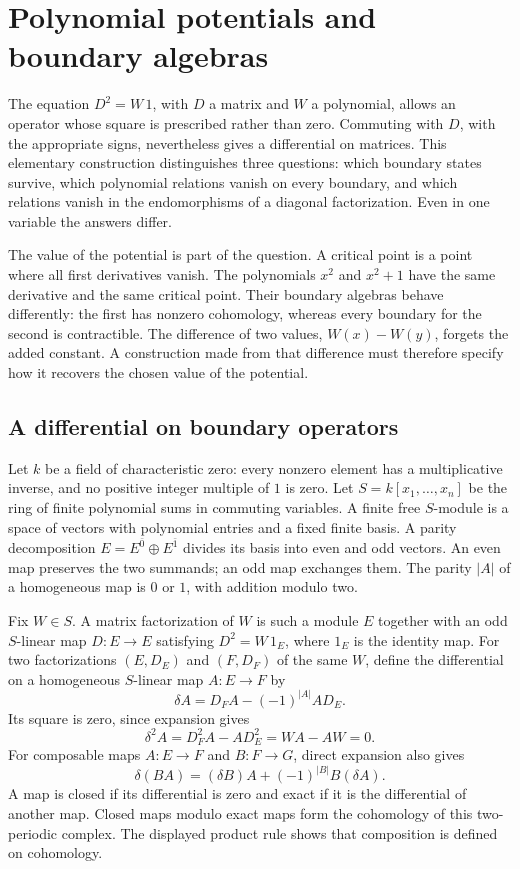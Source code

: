 \chapter{Polynomial potentials and boundary algebras}
\label{ch:polynomial-boundary-algebras}

The equation \(D^2=W\,1\), with \(D\) a matrix and \(W\) a polynomial,
allows an operator whose square is prescribed rather than zero.
Commuting with \(D\), with the appropriate signs, nevertheless gives
a differential on matrices. This elementary construction distinguishes
three questions: which boundary states survive, which polynomial
relations vanish on every boundary, and which relations vanish in the
endomorphisms of a diagonal factorization. Even in one variable the
answers differ.

The value of the potential is part of the question. A critical point
is a point where all first derivatives vanish. The polynomials
\(x^2\) and \(x^2+1\) have the same derivative and the same critical
point. Their boundary algebras behave differently: the first has
nonzero cohomology, whereas every boundary for the second is
contractible. The difference of two values,
\(W(x)-W(y)\), forgets the added constant. A construction made from
that difference must therefore specify how it recovers the chosen
value of the potential.

\section{A differential on boundary operators}
\label{sec:pb-boundary-differential}

Let \(k\) be a field of characteristic zero: every nonzero element has
a multiplicative inverse, and no positive integer multiple of \(1\)
is zero. Let \(S=k[x_1,\ldots,x_n]\) be the ring of finite polynomial
sums in commuting variables. A finite free \(S\)-module is a space of
vectors with polynomial entries and a fixed finite basis. A parity
decomposition \(E=E^{\bar0}\oplus E^{\bar1}\) divides its basis into
even and odd vectors. An even map preserves the two summands; an odd
map exchanges them. The parity \(|A|\) of a homogeneous map is \(0\)
or \(1\), with addition modulo two.

Fix \(W\in S\). A matrix factorization of \(W\) is such a module \(E\)
together with an odd \(S\)-linear map \(D:E\to E\) satisfying
\(D^2=W\,1_E\), where \(1_E\) is the identity map. For two
factorizations \((E,D_E)\) and \((F,D_F)\) of the same \(W\), define
the differential on a homogeneous \(S\)-linear map \(A:E\to F\) by
\begin{equation}
 \delta A=D_FA-(-1)^{|A|}AD_E .
 \label{eq:pb-differential}
\end{equation}
Its square is zero, since expansion gives
\[
 \delta^2A=D_F^2A-AD_E^2=WA-AW=0.
\]
For composable maps \(A:E\to F\) and \(B:F\to G\), direct expansion
also gives
\[
 \delta(BA)=(\delta B)A+(-1)^{|B|}B(\delta A).
\]
A map is closed if its differential is zero and exact if it is the
differential of another map. Closed maps modulo exact maps form the
cohomology of this two-periodic complex. The displayed product rule
shows that composition is defined on cohomology.

